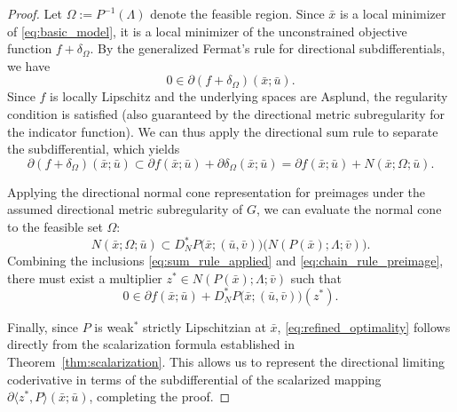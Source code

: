 \documentclass[12pt,twoside,reqno]{amsart}
\theoremstyle{definition}
\numberwithin{equation}{section}
\begin{document}
\begin{proof}
    Let $\Omega := P^{-1}(\Lambda)$ denote the feasible region. Since $\bar{x}$ is a local minimizer of \eqref{eq:basic_model}, it is a local minimizer of the unconstrained objective function $f + \delta_\Omega$. By the generalized Fermat's rule for directional subdifferentials, we have
    \begin{equation*}
        0 \in \partial (f + \delta_\Omega)(\bar{x}; \bar{u}).
    \end{equation*}
    Since $f$ is locally Lipschitz and the underlying spaces are Asplund, the regularity condition is satisfied (also guaranteed by the directional metric subregularity for the indicator function). We can thus apply the directional sum rule \cite[Theorem 2.13]{mao2025directional} to separate the subdifferential, which yields
    \begin{equation} \label{eq:sum_rule_applied}
        \partial(f + \delta_\Omega)(\bar{x}; \bar{u}) \subset \partial f(\bar{x}; \bar{u}) + \partial \delta_\Omega(\bar{x}; \bar{u}) = \partial f(\bar{x}; \bar{u}) + N(\bar{x}; \Omega; \bar{u}).
    \end{equation}
 
    Applying the directional normal cone representation for preimages \cite[Theorem~2.1]{mao2025directional} under the assumed directional metric subregularity of $G$, we can evaluate the normal cone to the feasible set $\Omega$:
    \begin{equation} \label{eq:chain_rule_preimage}
        N(\bar{x}; \Omega; \bar{u}) \subset D_N^* P\big(\bar{x}; (\bar{u}, \bar{v})\big) \big( N(P(\bar{x}); \Lambda; \bar{v}) \big).
    \end{equation}
    Combining the inclusions \eqref{eq:sum_rule_applied} and \eqref{eq:chain_rule_preimage}, there must exist a multiplier $z^* \in N(P(\bar{x}); \Lambda; \bar{v})$ such that 
    \begin{equation*}
        0 \in \partial f(\bar{x}; \bar{u}) + D_N^* P\big(\bar{x}; (\bar{u}, \bar{v})\big)(z^*). 
    \end{equation*}

    Finally, since $P$ is weak\(^*\) strictly Lipschitzian at $\bar{x}$, \eqref{eq:refined_optimality} follows directly from the scalarization formula established in Theorem~\ref{thm:scalarization}. This allows us to represent the directional limiting coderivative in terms of the subdifferential of the scalarized mapping $\partial \langle z^*, P \rangle (\bar{x}; \bar{u})$, completing the proof.   
\end{proof}
\end{document}
